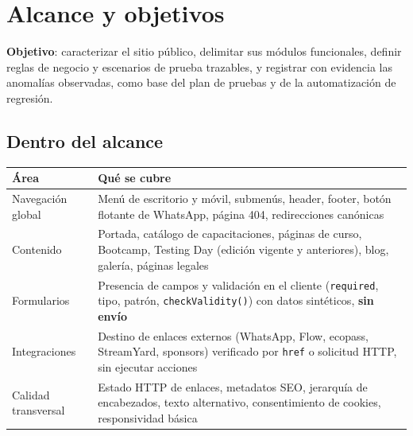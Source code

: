 \documentclass[11pt,a4paper]{article}
\newcommand{\code}[1]{\texttt{#1}}
\begin{document}
\section{Alcance y objetivos}

\textbf{Objetivo}: caracterizar el sitio público, delimitar sus módulos funcionales, definir
reglas de negocio y escenarios de prueba trazables, y registrar con evidencia las anomalías
observadas, como base del plan de pruebas y de la automatización de regresión.

\subsection{Dentro del alcance}
\begin{table}[H]
\centering\small
\begin{tabularx}{\textwidth}{@{}l X@{}}
\toprule
Área & Qué se cubre \\
\midrule
Navegación global & Menú de escritorio y móvil, submenús, header, footer, botón flotante de
  WhatsApp, página 404, redirecciones canónicas \\
Contenido & Portada, catálogo de capacitaciones, páginas de curso, Bootcamp, Testing Day
  (edición vigente y anteriores), blog, galería, páginas legales \\
Formularios & Presencia de campos y validación en el cliente (\code{required}, tipo, patrón,
  \code{checkValidity()}) con datos sintéticos, \textbf{sin envío} \\
Integraciones & Destino de enlaces externos (WhatsApp, Flow, ecopass, StreamYard, sponsors)
  verificado por \code{href} o solicitud HTTP, sin ejecutar acciones \\
Calidad transversal & Estado HTTP de enlaces, metadatos SEO, jerarquía de encabezados, texto
  alternativo, consentimiento de cookies, responsividad básica \\
\bottomrule
\end{tabularx}
\end{table}
\end{document}

